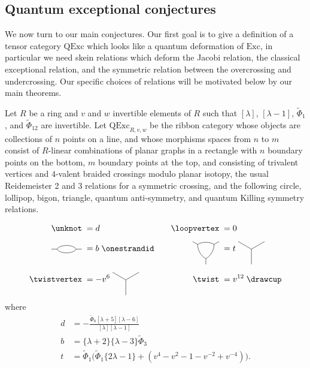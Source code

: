 \documentclass[12pt]{amsart}
\begin{document}
\subsection{Quantum exceptional conjectures}

We now turn to our main conjectures.  Our first goal is to give a definition of a tensor category $\mathrm{QExc}$ which looks like a quantum deformation of $\mathrm{Exc}$, in particular we need skein relations which deform the Jacobi relation, the classical exceptional relation, and the symmetric relation between the overcrossing and undercrossing.  Our specific choices of relations will be motivated below by our main theorems. 

\begin{definition}
Let $R$ be a ring and $v$ and $w$ invertible elements of $R$ such that $[\lambda]$, $[\lambda-1]$, $\widetilde{\Phi}_1$, and $\widetilde{\Phi}_{12}$ are invertible. 
Let  $\mathrm{QExc}_{R,v,w}$ be the ribbon category whose objects are collections of $n$
points on a line, and whose morphisms spaces from $n$ to $m$ consist of $R$-linear
combinations of planar graphs in a rectangle with $n$ boundary points on the
bottom, $m$ boundary points at the top, and consisting of trivalent vertices
and $4$-valent braided crossings modulo planar isotopy, the usual Reidemeister
2 and 3 relations for a symmetric crossing, and the following circle,
lollipop, bigon, triangle, quantum anti-symmetry, and quantum Killing
symmetry
relations.

 \begin{equation}
    \label{eq:simple-rels-spec}
  \begin{aligned}
    \unknot\; &= d&\quad
    \loopvertex\;&=0\\[5pt]
      \ngon{2}\;&= b\;\onestrandid&
        \ngon[-90]{3}\; &= t\;\nvertex[-90]{3}\\[5pt]
    \twistvertex\; &= -v^{6}\;\nvertex[-90]{3}&
      \twist\; &= v^{12}\;\drawcup
  \end{aligned}
  \end{equation}
where
\begin{align*}
  d &= -\frac{\widetilde{\Phi}_8 [\lambda+5][\lambda-6]}{[\lambda][\lambda-1]}\\
  b &= \{\lambda+2\}\{\lambda-3\}\widetilde{\Phi}_3\\
  t &= \widetilde{\Phi}_1 \bigl(\widetilde{\Phi}_1 \{2\lambda -1\} + (v^4 - v^2 - 1 - v^{-2} + v^{-4})\bigr).
\end{align*}



\end{definition}
\end{document}
